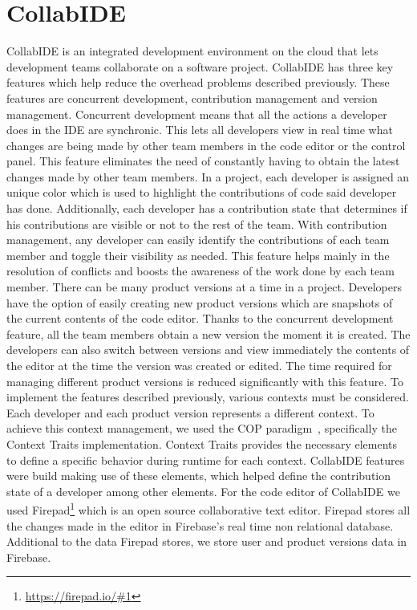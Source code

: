 
\section{CollabIDE}
\label{sec:collab-ide}

CollabIDE is an integrated development environment on the cloud that lets development teams 
collaborate on a software project. CollabIDE has three key features which help reduce the overhead 
problems described previously. These features are concurrent development, contribution management 
and version management.
Concurrent development means that all the actions a developer does in the IDE are synchronic. This 
lets all developers view in real time what changes are being made by other team members in the code 
editor or the control panel. This feature eliminates the need of constantly having to obtain the latest 
changes made by other team members. 
In a project, each developer is assigned an unique color which is used to highlight the contributions of 
code said developer has done. Additionally, each developer has a contribution state that determines if 
his contributions are visible or not to the rest of the team. With contribution management, any 
developer can easily identify the contributions of each team member and toggle their visibility as 
needed. This feature helps mainly in the resolution of conflicts and boosts the awareness of the work 
done by each team member.
There can be many product versions at a time in a project. Developers have the option of easily 
creating new product versions which are snapshots of the current contents of the code editor. Thanks 
to the concurrent development feature, all the team members obtain a new version the moment it is 
created. The developers can also switch between versions and view immediately the contents of the 
editor at the time the version was created or edited. The time required for managing different product 
versions is reduced significantly with this feature.
To implement the features described previously, various contexts must be considered. Each developer 
and each product version represents a different context. To achieve this context management, we used 
the \ac{COP} paradigm~\cite{salvaneschi+12survey}, specifically the Context Traits implementation. 
Context Traits provides the necessary elements to define a specific behavior during runtime for each 
context. CollabIDE features were build making use of these elements, which helped define the 
contribution state of a developer among other elements.
For the code editor of CollabIDE we used Firepad\footnote{\url{https://firepad.io/\#1}} which is an open 
source collaborative text editor. Firepad stores all the changes made in the editor in Firebase’s real 
time non relational database. Additional to the data Firepad stores, we store user and product versions 
data in Firebase.


\endinput